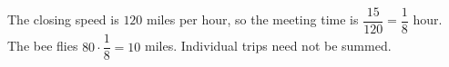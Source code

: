 The closing speed is $120$ miles per hour, so the meeting time is $\dfrac{15}{120}=\dfrac{1}{8}$ hour. The bee flies $80\cdot\dfrac{1}{8}=\boxed{10}$ miles. Individual trips need not be summed.
